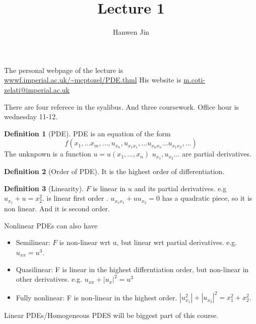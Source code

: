 \documentclass[a4paper]{article}
\title{Lecture 1}
\author{Hanwen Jin}
\theoremstyle{definition}
\newtheorem{definition}{Definition}
\begin{document}
	\maketitle
	The personal webpage of the lecture is \url{wwwf.imperial.ac.uk/~mcptozel/PDE.thml} His website is \url{m.coti-zelati@imperial.ac.uk}	

	There are four referece in the syalibus. And three coursework. Office hour is wednesday 11-12. 

	\begin{definition}[PDE]
		PDE is an equation of the form 
		\begin{equation}
			f\left( x_1,\ldots x_m,\ldots , u_{x_n}, u_{x_1x_1},  \ldots u_{x_nx_n}\ldots u_{x_1x_2}, \ldots\right) 
		\end{equation} 
		The unknpown is a function $u=u\left( x_1 , \ldots , x_n \right) $ $u_{x_1}, u_{x_2}\ldots$ are partial derivatives. 
	\end{definition}
	\begin{definition}[Order of PDE]
		It is the highest order of differentiation. 
	\end{definition}
	\begin{definition}[Linearity]
		$F$ is linear in $u$ and its partial derivatives. e.g$u_{x_1}+u=x_2^2$. is linear first order . $u_{x_1x_1}+uu_{x_2}=0$ has a quadratic piece, so it is non linear. And it is second order.  
	\end{definition}
	Nonlinear PDEs can also have 
	\begin{itemize}
		\item Semilinear: $F$ is non-linear wrt u, but linear wrt partial derivatives. e.g. $u_{x x}=u^3$. 
		\item Quasilinear: F is linear in the highest differntiation order, but non-linear in other derivatives. e.g. $u_{x x }+\left|u_x \right|^2=u^3 $
		\item Fully nonlinear: F is non-linear in the highest order. $\left|u_{x_1}^2\right| +\left|u_{x_2} \right|^2=x_1^2+x_2^2  $. 
	\end{itemize}
	Linear PDEs/Homogeneous PDES will be biggest part of this course.
\end{document}
